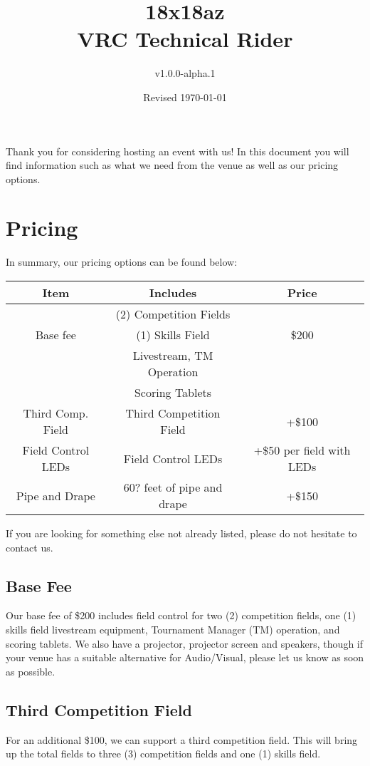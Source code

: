 \documentclass[12pt]{article}
\title{18x18az\\VRC Technical Rider}
\author{v1.0.0-alpha.1}
\date{Revised \today}
\begin{document}
\maketitle
Thank you for considering hosting an event with us!
In this document you will find information such as what we need from the venue as well as our pricing options.
\tableofcontents
\pagebreak
\section{Pricing}

In summary, our pricing options can be found below:
\begin{center}
    \begin{tabular}{|c|c|c|}
        \hline
        \textbf{Item} & \textbf{Includes} & \textbf{Price} \\
        \hline
                 & (2) Competition Fields   &  \\
        Base fee & (1) Skills Field         & \$200 \\
                 & Livestream, TM Operation & \\
                 & Scoring Tablets          & \\
        \hline
        Third Comp. Field & Third Competition Field & +\$100 \\
        \hline
        Field Control LEDs & Field Control LEDs & +\$50 per field with LEDs \\
        \hline
        Pipe and Drape & 60? feet of pipe and drape & +\$150 \\
        \hline
    \end{tabular}
\end{center}
If you are looking for something else not already listed, please do not hesitate to contact us.

\subsection{Base Fee}
Our base fee of \$200 includes field control for two (2) competition fields, one (1) skills field livestream equipment, Tournament Manager (TM) operation, and scoring tablets.
We also have a projector, projector screen and speakers, though if your venue has a suitable alternative for Audio/Visual, please let us know as soon as possible.

\subsection{Third Competition Field}
For an additional \$100, we can support a third competition field.
This will bring up the total fields to three (3) competition fields and one (1) skills field.
\end{document}
